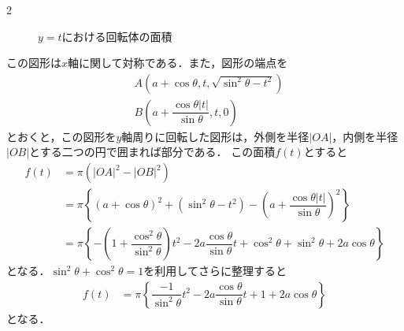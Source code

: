 \documentclass[../../main.tex]{subfiles}
\begin{document}
\begin{multicols}{2}
\begin{figure}[H]
\caption{$y=t$における回転体の面積}
\label{2006-2:fig:2}
\end{figure}

この図形は$x$軸に関して対称である．また，図形の端点を
\begin{align}
& A(a+\cos\theta,t, \sqrt{\sin^2\theta-t^2}) \\
& B(a+\dfrac{\cos\theta |t|}{\sin\theta},t,0)
\end{align}
とおくと，この図形を$y$軸周りに回転した図形は，外側を半径$|OA|$，内側を半径$|OB|$とする二つの円で囲まれば部分である．
この面積$f(t)$とすると
\begin{align}
f(t)
& = \pi\left(|OA|^2-|OB|^2\right)                                                                                                                            \\
& = \pi\left\{(a+\cos\theta)^2+(\sin^2\theta-t^2) - (a+\dfrac{\cos\theta |t|}{\sin\theta})^2\right\}                                                          \\
& = \pi \left\{ -\left(1+\dfrac{\cos^2\theta}{\sin^2\theta}\right)t^2 - 2a\dfrac{\cos\theta}{\sin\theta}t + \cos^2\theta + \sin^2\theta +2a\cos\theta \right\}
\end{align}
となる．$\sin^2\theta+\cos^2\theta=1$を利用してさらに整理すると
\begin{align}
f(t)
& = \pi \left\{ \dfrac{-1}{\sin^2\theta}t^2 -  2a\dfrac{\cos\theta}{\sin\theta}t + 1 + 2a\cos\theta \right\}
\end{align}
となる．


\end{multicols}
\end{document}
